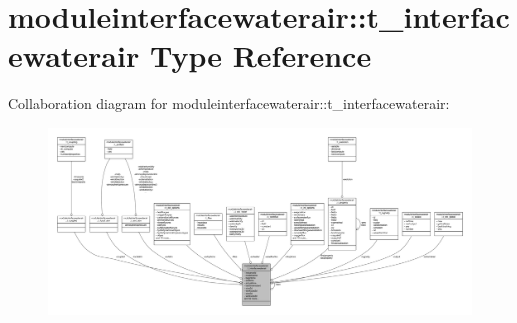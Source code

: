 \hypertarget{structmoduleinterfacewaterair_1_1t__interfacewaterair}{}\section{moduleinterfacewaterair\+:\+:t\+\_\+interfacewaterair Type Reference}
\label{structmoduleinterfacewaterair_1_1t__interfacewaterair}


Collaboration diagram for moduleinterfacewaterair\+:\+:t\+\_\+interfacewaterair\+:\nopagebreak
\begin{figure}[H]
\begin{center}
\leavevmode
\includegraphics[width=350pt]{structmoduleinterfacewaterair_1_1t__interfacewaterair__coll__graph}
\end{center}
\end{figure}
